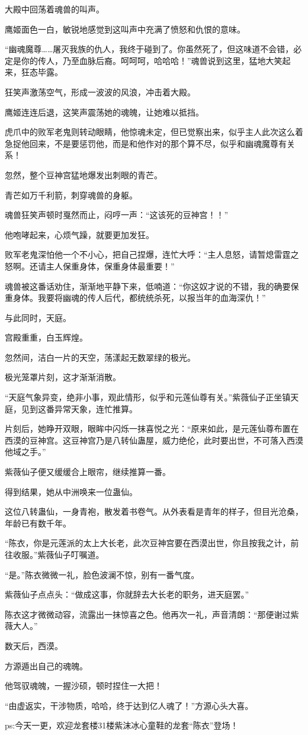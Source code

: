 \begin{this_body}
大殿中回荡着魂兽的叫声。

鹰姬面色一白，敏锐地感觉到这叫声中充满了愤怒和仇恨的意味。

“幽魂魔尊……屠灭我族的仇人，我终于碰到了。你虽然死了，但这味道不会错，必定是你的传人，乃至血脉后裔。呵呵呵，哈哈哈！”魂兽说到这里，猛地大笑起来，狂态毕露。

狂笑声激荡空气，形成一波波的风浪，冲击着大殿。

鹰姬连连后退，这笑声震荡她的魂魄，让她难以抵挡。

虎爪中的败军老鬼则转动眼睛，他惊魂未定，但已觉察出来，似乎主人此次这么着急捉他回来，不是要惩罚他，而是和他作对的那个算不尽，似乎和幽魂魔尊有关系！

忽然，整个豆神宫猛地爆发出刺眼的青芒。

青芒如万千利箭，刺穿魂兽的身躯。

魂兽狂笑声顿时戛然而止，闷哼一声：“这该死的豆神宫！！”

他咆哮起来，心烦气躁，就要更加发狂。

败军老鬼深怕他一个不小心，把自己捏爆，连忙大呼：“主人息怒，请暂熄雷霆之怒啊。还请主人保重身体，保重身体最重要！”

魂兽被这番话劝住，渐渐地平静下来，低喃道：“你这奴才说的不错，我的确要保重身体。我要将幽魂的传人后代，都统统杀死，以报当年的血海深仇！”

与此同时，天庭。

宫殿重重，白玉辉煌。

忽然间，洁白一片的天空，荡漾起无数翠绿的极光。

极光笼罩片刻，这才渐渐消散。

“天庭气象异变，绝非小事，观此情形，似乎和元莲仙尊有关。”紫薇仙子正坐镇天庭，见到这番异常天象，连忙推算。

片刻后，她睁开双眼，眼眸中闪烁一抹喜悦之光：“原来如此，是元莲仙尊布置在西漠的豆神宫。这豆神宫乃是八转仙蛊屋，威力绝伦，此时要出世，不可落入西漠他域之手。”

紫薇仙子便又缓缓合上眼帘，继续推算一番。

得到结果，她从中洲唤来一位蛊仙。

这位八转蛊仙，一身青袍，散发着书卷气。从外表看是青年的样子，但目光沧桑，年龄已有数千年。

“陈衣，你是元莲派的太上大长老，此次豆神宫要在西漠出世，你且按我之计，前往收服。”紫薇仙子叮嘱道。

“是。”陈衣微微一礼，脸色波澜不惊，别有一番气度。

紫薇仙子点点头：“做成这事，你就辞去大长老的职务，进天庭罢。”

陈衣这才微微动容，流露出一抹惊喜之色。他再次一礼，声音清朗：“那便谢过紫薇大人。”

数天后，西漠。

方源遁出自己的魂魄。

他驾驭魂魄，一握沙硕，顿时捏住一大把！

“由虚返实，干涉物质，哈哈，终于达到亿人魂了！”方源心头大喜。

ps:今天一更，欢迎龙套楼31楼紫沫冰心童鞋的龙套“陈衣”登场！

\end{this_body}

